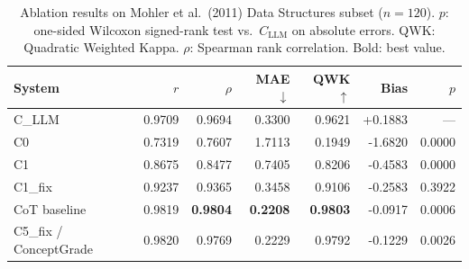 \begin{table}[ht]\centering
\caption{Ablation results on Mohler et al.\ (2011) Data Structures subset ($n=120$). $p$: one-sided Wilcoxon signed-rank test vs.\ $C_{\text{LLM}}$ on absolute errors. QWK: Quadratic Weighted Kappa. $\rho$: Spearman rank correlation. Bold: best value.}
\label{tab:main_results}
\begin{tabular}{@{}lrrrrrr@{}}\toprule
\textbf{System} & \textbf{$r$} & \textbf{$\rho$} & \textbf{MAE$\downarrow$} & \textbf{QWK$\uparrow$} & \textbf{Bias} & \textbf{$p$} \\\midrule
C_LLM & 0.9709 & 0.9694 & 0.3300 & 0.9621 & +0.1883 & --- \\
C0 & 0.7319 & 0.7607 & 1.7113 & 0.1949 & -1.6820 & 0.0000 \\
C1 & 0.8675 & 0.8477 & 0.7405 & 0.8206 & -0.4583 & 0.0000 \\
C1_fix & 0.9237 & 0.9365 & 0.3458 & 0.9106 & -0.2583 & 0.3922 \\
CoT baseline & 0.9819 & \textbf{0.9804} & \textbf{0.2208} & \textbf{0.9803} & -0.0917 & 0.0006 \\
C5_fix / ConceptGrade & 0.9820 & 0.9769 & 0.2229 & 0.9792 & -0.1229 & 0.0026 \\
\bottomrule
\end{tabular}
\end{table}


